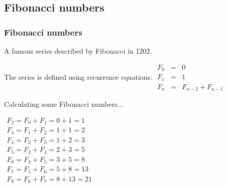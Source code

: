 \documentclass{beamer}
\begin{document}
\subsection{Fibonacci numbers}

\begin{frame}[fragile]
\frametitle{Fibonacci numbers}

A famous series described by Fibonacci in 1202.

The series is defined using recurrence equations:
$\begin{array}{rcl}
F_{0} &=& 0 \\
F_{1} &=& 1 \\
F_{n} &=& F_{n-2} + F_{n-1}
\end{array}$

\vspace{1em}

Calculating some Fibonacci numbers$\ldots$

\vspace{1em}

$\begin{array}{l}
F_2 = F_0 + F_1 = 0 + 1 = 1 \\
F_3 = F_1 + F_2 = 1 + 1 = 2 \\
F_4 = F_2 + F_3 = 1 + 2 = 3 \\
F_5 = F_3 + F_4 = 2 + 3 = 5 \\
F_6 = F_4 + F_5 = 3 + 5 = 8 \\
F_7 = F_5 + F_6 = 5 + 8 = 13 \\
F_8 = F_6 + F_7 = 8 + 13 = 21 \\
\end{array}$

\end{frame}
\end{document}
